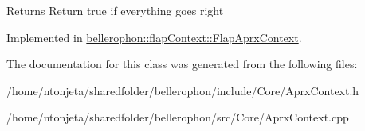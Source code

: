 \begin{DoxyReturn}{Returns}
Return true if everything goes right 
\end{DoxyReturn}


Implemented in \hyperlink{classbellerophon_1_1flapContext_1_1FlapAprxContext_a3198868b5a8708c4976db9f1a70e70d5}{bellerophon\+::flap\+Context\+::\+Flap\+Aprx\+Context}.



The documentation for this class was generated from the following files\+:\begin{DoxyCompactItemize}
\item 
/home/ntonjeta/sharedfolder/bellerophon/include/\+Core/Aprx\+Context.\+h\item 
/home/ntonjeta/sharedfolder/bellerophon/src/\+Core/Aprx\+Context.\+cpp\end{DoxyCompactItemize}
